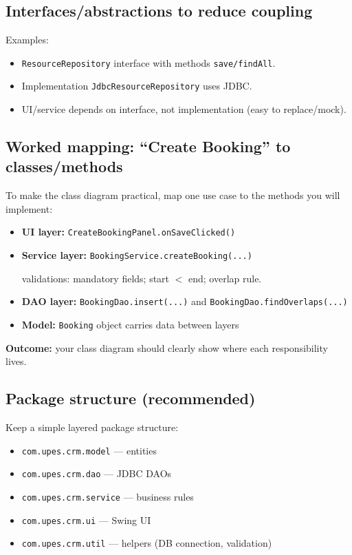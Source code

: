 \documentclass[11pt]{article}
\begin{document}
\subsection{Interfaces/abstractions to reduce coupling}
Examples:
\begin{itemize}
  \item \texttt{ResourceRepository} interface with methods \texttt{save/findAll}.
  \item Implementation \texttt{JdbcResourceRepository} uses JDBC.
  \item UI/service depends on interface, not implementation (easy to replace/mock).
\end{itemize}

\subsection{Worked mapping: ``Create Booking'' to classes/methods}
To make the class diagram practical, map one use case to the methods you will implement:
\begin{itemize}
  \item \textbf{UI layer:} \texttt{CreateBookingPanel.onSaveClicked()}
  \item \textbf{Service layer:} \texttt{BookingService.createBooking(...)}\par
  validations: mandatory fields; start $<$ end; overlap rule.
  \item \textbf{DAO layer:} \texttt{BookingDao.insert(...)} and \texttt{BookingDao.findOverlaps(...)}
  \item \textbf{Model:} \texttt{Booking} object carries data between layers
\end{itemize}
\textbf{Outcome:} your class diagram should clearly show where each responsibility lives.

\subsection{Package structure (recommended)}
Keep a simple layered package structure:
\begin{itemize}
  \item \texttt{com.upes.crm.model} --- entities
  \item \texttt{com.upes.crm.dao} --- JDBC DAOs
  \item \texttt{com.upes.crm.service} --- business rules
  \item \texttt{com.upes.crm.ui} --- Swing UI
  \item \texttt{com.upes.crm.util} --- helpers (DB connection, validation)
\end{itemize}
\notesources{\OOPSUnitVISources}
\end{document}
